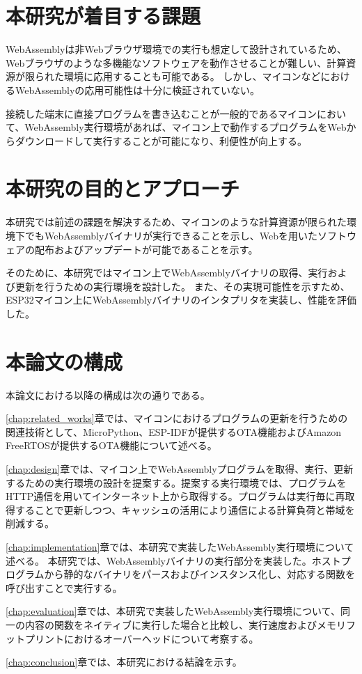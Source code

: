 \section{本研究が着目する課題}

WebAssemblyは非Webブラウザ環境での実行も想定して設計されているため、Webブラウザのような多機能なソフトウェアを動作させることが難しい、計算資源が限られた環境に応用することも可能である。
しかし、マイコンなどにおけるWebAssemblyの応用可能性は十分に検証されていない。

接続した端末に直接プログラムを書き込むことが一般的であるマイコンにおいて、WebAssembly実行環境があれば、マイコン上で動作するプログラムをWebからダウンロードして実行することが可能になり、利便性が向上する。

\section{本研究の目的とアプローチ}

本研究では前述の課題を解決するため、マイコンのような計算資源が限られた環境下でもWebAssemblyバイナリが実行できることを示し、Webを用いたソフトウェアの配布およびアップデートが可能であることを示す。

そのために、本研究ではマイコン上でWebAssemblyバイナリの取得、実行および更新を行うための実行環境を設計した。
また、その実現可能性を示すため、ESP32マイコン上にWebAssemblyバイナリのインタプリタを実装し、性能を評価した。

\section{本論文の構成}

本論文における以降の構成は次の通りである。

\ref{chap:related_works}章では、マイコンにおけるプログラムの更新を行うための関連技術として、MicroPython、ESP-IDFが提供するOTA機能およびAmazon FreeRTOSが提供するOTA機能について述べる。

\ref{chap:design}章では、マイコン上でWebAssemblyプログラムを取得、実行、更新するための実行環境の設計を提案する。提案する実行環境では、プログラムをHTTP通信を用いてインターネット上から取得する。プログラムは実行毎に再取得することで更新しつつ、キャッシュの活用により通信による計算負荷と帯域を削減する。

\ref{chap:implementation}章では、本研究で実装したWebAssembly実行環境について述べる。
本研究では、WebAssemblyバイナリの実行部分を実装した。ホストプログラムから静的なバイナリをパースおよびインスタンス化し、対応する関数を呼び出すことで実行する。

\ref{chap:evaluation}章では、本研究で実装したWebAssembly実行環境について、同一の内容の関数をネイティブに実行した場合と比較し、実行速度およびメモリフットプリントにおけるオーバーヘッドについて考察する。

\ref{chap:conclusion}章では、本研究における結論を示す。
